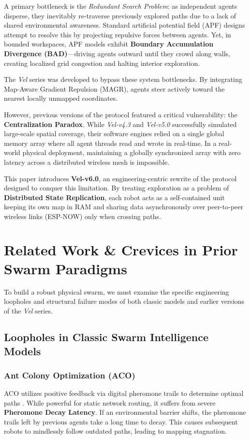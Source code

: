 \documentclass[letterpaper, 10pt, conference]{IEEEtran}
\begin{document}
A primary bottleneck is the \textit{Redundant Search Problem}: as independent agents disperse, they inevitably re-traverse previously explored paths due to a lack of shared environmental awareness. Standard artificial potential field (APF) designs attempt to resolve this by projecting repulsive forces between agents. Yet, in bounded workspaces, APF models exhibit \textbf{Boundary Accumulation Divergence (BAD)}---driving agents outward until they crowd along walls, creating localized grid congestion and halting interior exploration.

The \textit{Vel} series was developed to bypass these system bottlenecks. By integrating Map-Aware Gradient Repulsion (MAGR), agents steer actively toward the nearest locally unmapped coordinates.

However, previous versions of the protocol featured a critical vulnerability: the \textbf{Centralization Paradox}. While \textit{Vel-v4.3} and \textit{Vel-v5.0} successfully simulated large-scale spatial coverage, their software engines relied on a single global memory array where all agent threads read and wrote in real-time. In a real-world physical deployment, maintaining a globally synchronized array with zero latency across a distributed wireless mesh is impossible. 

This paper introduces \textbf{Vel-v6.0}, an engineering-centric rewrite of the protocol designed to conquer this limitation. By treating exploration as a problem of \textbf{Distributed State Replication}, each robot acts as a self-contained unit keeping its own map in RAM and sharing data asynchronously over peer-to-peer wireless links (ESP-NOW) only when crossing paths.

\section{Related Work \& Crevices in Prior Swarm Paradigms}
\label{sec:related}

To build a robust physical swarm, we must examine the specific engineering loopholes and structural failure modes of both classic models and earlier versions of the \textit{Vel} series.

\subsection{Loopholes in Classic Swarm Intelligence Models}
\subsubsection{Ant Colony Optimization (ACO)}
ACO utilizes positive feedback via digital pheromone trails to determine optimal paths \cite{dorigo2006ant}. While powerful for static network routing, it suffers from severe \textbf{Pheromone Decay Latency}. If an environmental barrier shifts, the pheromone trails left by previous agents take a long time to decay. This causes subsequent robots to mindlessly follow outdated paths, leading to mapping stagnation.
\end{document}
